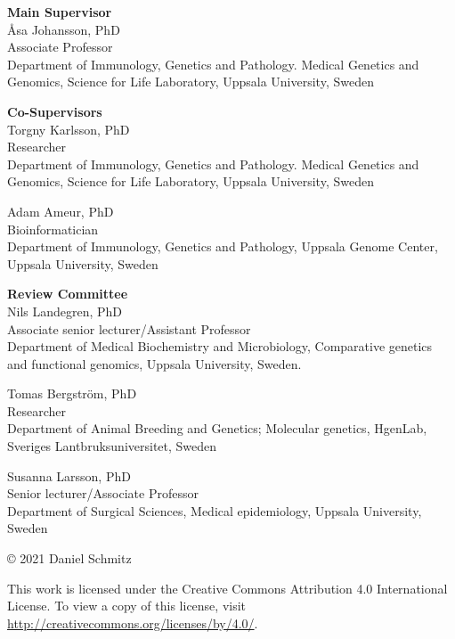 \documentclass[twoside=false]{scrbook}
\begin{document}
{ %
    \raggedright
    \textbf{Main Supervisor}\\
    Åsa Johansson, PhD\\
    Associate Professor \\
    Department of Immunology, Genetics and Pathology. Medical Genetics and Genomics, Science for Life Laboratory, Uppsala University, Sweden

    \textbf{Co-Supervisors}\\
    Torgny Karlsson, PhD\\
    Researcher \\
    Department of Immunology, Genetics and Pathology. Medical Genetics and Genomics, Science for Life Laboratory, Uppsala University, Sweden

    Adam Ameur, PhD \\
    Bioinformatician \\
    Department of Immunology, Genetics and Pathology, Uppsala Genome Center, Uppsala University, Sweden

    \textbf{Review Committee}\\
    Nils Landegren, PhD\\
    Associate senior lecturer/Assistant Professor\\
    Department of Medical Biochemistry and Microbiology, Comparative genetics and functional genomics, Uppsala University, Sweden.

    Tomas Bergström, PhD\\
    Researcher\\
    Department of Animal Breeding and Genetics; Molecular genetics, HgenLab, Sveriges Lantbruksuniversitet, Sweden

    Susanna Larsson, PhD\\
    Senior lecturer/Associate Professor\\
    Department of Surgical Sciences, Medical epidemiology, Uppsala University, Sweden

    \vfill
    \footnotesize
    © 2021 Daniel Schmitz

    This work is licensed under the Creative Commons Attribution 4.0 International License. To view a copy of this license, visit \url{http://creativecommons.org/licenses/by/4.0/}.
}

\parskip 0pt
\parindent \oldparindent
\end{document}
